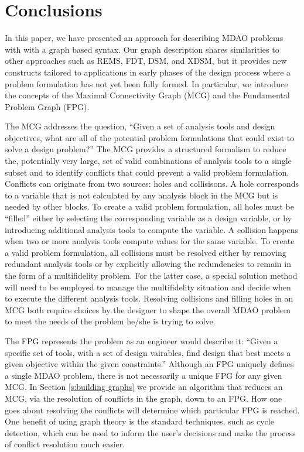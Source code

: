 \section*{Conclusions}
In this paper, we have presented an approach for describing  MDAO problems with 
with a graph based syntax.  Our graph description shares 
similarities to other approaches such as REMS, FDT, DSM, and XDSM, but 
it provides new constructs tailored to applications in early phases of the design 
process where a problem formulation has not yet been fully formed.   
In particular, we introduce the concepts of the Maximal Connectivity Graph (MCG) 
and the Fundamental Problem Graph (FPG).  

The MCG addresses the question, ``Given a set of analysis tools and design objectives, what are all 
of the potential problem formulations that could exist to solve a design problem?''  
The MCG provides a structured formalism to reduce the, potentially very large, 
set of valid combinations of analysis tools to a single subset and to identify
conflicts that could prevent a valid problem formulation.
Conflicts can originate from two sources: holes and collisisons. A hole 
corresponds to a variable that is not calculated by any analysis block in the 
MCG but is needed by other blocks. To create a valid problem formulation, all 
holes must be ``filled'' either by selecting the corresponding variable as a 
design variable, or by introducing additional analysis tools to compute the variable.  
A collision happens when two or more analysis tools compute values for the same variable.  
To create a valid problem formulation, all collisions must be resolved either by 
removing redundant analysis tools or by explicitly allowing the redundencies to remain 
in the form of a multifidelity problem. For the latter case, a special solution 
method will need to be employed to manage the multifidelity situation and decide 
when to execute the different analysis tools. Resolving collisions and filling 
holes in an MCG both require choices by the designer to shape the overall
MDAO problem to meet the needs of the problem he/she is trying to solve. 

The FPG represents the problem as an engineer would describe it: ``Given a specific set of tools, 
with a set of design vairables, find design that best meets a given objective
within the given constraints.'' Although an FPG uniquely defines a single MDAO problem, 
there is not necessarily a unique FPG for any given MCG. In Section 
\ref{s:building graphs} we provide an algorithm 
that reduces an MCG, via the resolution of conflicts in the graph, down to an FPG. 
How one goes about resolving the conflicts will determine which particular FPG is reached. 
One benefit of using graph theory is the standard techniques, such as cycle 
detection, which can be used to inform the user's decisions and make the process of conflict 
resolution much easier. 

